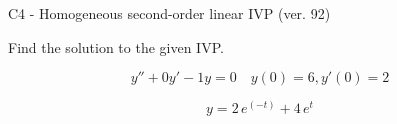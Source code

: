 \begin{exercise}
  \begin{exerciseTitle}C4 - Homogeneous second-order linear IVP (ver. 92)\end{exerciseTitle}
  \begin{exerciseStatement}
    
Find the solution to the given IVP.

    
\[y''+0y'-1y = 0 \hspace{1em} y(0) = 6 , y'(0) = 2\]

  \end{exerciseStatement}
  \begin{exerciseAnswer}
    
\[y= 2 \, e^{\left(-t\right)} + 4 \, e^{t}\]

  \end{exerciseAnswer}
\end{exercise}